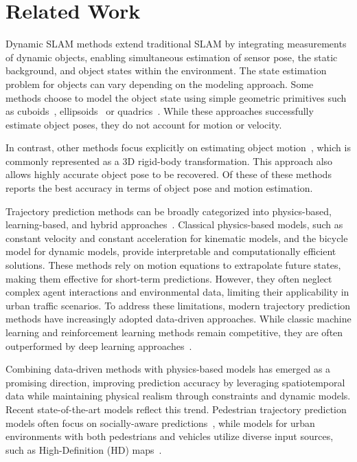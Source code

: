 \section{Related Work}
Dynamic SLAM methods extend traditional SLAM by integrating measurements of dynamic objects, enabling simultaneous estimation of sensor pose, the static background, and object states within the environment.
The state estimation problem for objects can vary depending on the modeling approach.
Some methods choose to model the object state using simple geometric primitives such as cuboids~\cite{gonzalez2023twistslam++}, ellipsoids~\cite{nicholson18cvpr} or quadrics~\cite{Tian2024its_dynaquadric}. 
While these approaches successfully estimate object poses, they do not account for motion or velocity.

In contrast, other methods focus explicitly on estimating object motion~\cite{morris2025dynosam, morris2024icra, judd2024ijrr_mvo, gonzalez2022twistslam}, which is commonly represented as a 3D rigid-body transformation. This approach also allows highly accurate object pose to be recovered. 
Of these of these methods~\cite{morris2025dynosam} reports the best accuracy in terms of object pose and motion estimation. 

Trajectory prediction methods can be broadly categorized into physics-based, learning-based, and hybrid approaches~\cite{huang2022survey, korbmacher2022review, wang2019exploring}. Classical physics-based models, such as constant velocity and constant acceleration for kinematic models, and the bicycle model for dynamic models, provide interpretable and computationally efficient solutions. These methods rely on motion equations to extrapolate future states, making them effective for short-term predictions. However, they often neglect complex agent interactions and environmental data, limiting their applicability in urban traffic scenarios. To address these limitations, modern trajectory prediction methods have increasingly adopted data-driven approaches.
While classic machine learning and reinforcement learning methods remain competitive, they are often outperformed by deep learning approaches~\cite{mozaffari2020deep}.

Combining data-driven methods with physics-based models has emerged as a promising direction, improving prediction accuracy by leveraging spatiotemporal data while maintaining physical realism through constraints and dynamic models. Recent state-of-the-art models reflect this trend. Pedestrian trajectory prediction models often focus on socially-aware predictions~\cite{yue2022human, gupta2018social}, while models for urban environments with both pedestrians and vehicles utilize diverse input sources, such as High-Definition (HD) maps~\cite{salzmann2020trajectron++, lee2017desire, schafer2024caspnet++, feng2024unitraj}.

